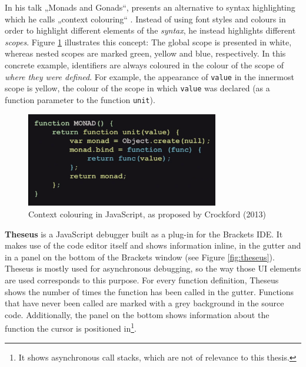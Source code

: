 In his talk „Monads and Gonads“,  presents an
alternative to syntax highlighting which he calls „context colouring“
\citeyear{crockford}. Instead of using font styles and colours in order
to highlight different elements of the \emph{syntax}, he instead
highlights different \emph{scopes}. Figure \ref{fig:contexthighlighting}
illustrates this concept: The global scope is presented in white,
whereas nested scopes are marked green, yellow and blue, respectively.
In this concrete example, identifiers are always coloured in the colour
of the scope of \emph{where they were defined}. For example, the
appearance of \texttt{value} in the innermost scope is yellow, the
colour of the scope in which \texttt{value} was declared (as a function
parameter to the function \texttt{unit}).

\begin{figure}[htbp]
\centering
\includegraphics[keepaspectratio,width=0.75\textwidth]{img/context.png}
\caption{Context colouring in JavaScript, as proposed by Crockford (2013)}
\label{fig:contexthighlighting}
\end{figure}

\textbf{Theseus} is a JavaScript debugger built as a plug-in for the
Brackets IDE. It makes use of the code editor itself and shows
information inline, in the gutter and in a panel on the bottom of the
Brackets window (see Figure \ref{fig:theseus}). Theseus is mostly used
for asynchronous debugging, so the way those UI elements are used
corresponds to this purpose. For every function definition, Theseus
shows the number of times the function has been called in the gutter.
Functions that have never been called are marked with a grey background
in the source code. Additionally, the panel on the bottom shows
information about the function the cursor is positioned
in\footnote{It shows asynchronous call stacks, which are not of relevance to this thesis.}.

